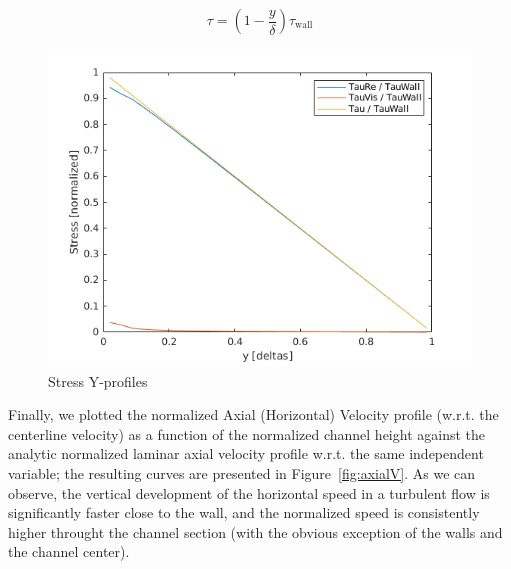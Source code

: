 \documentclass[12pt]{article}
\begin{document}
        \begin{equation} \label{eq:stress}
                \tau = (1 - \frac{y}{\delta}) \tau_{\text{wall}}
        \end{equation}

        \begin{figure}[ht!]
                \centering
                \includegraphics[width=\textwidth]{stress.png}
                \caption{Stress Y-profiles}
                \label{fig:stress}
        \end{figure}

        Finally, we plotted the normalized Axial (Horizontal) Velocity profile (w.r.t. the centerline velocity) as a function of the normalized channel height against the analytic normalized laminar axial velocity profile w.r.t. the same independent variable; the resulting curves are presented in Figure~\ref{fig:axialV}. As we can observe, the vertical development of the horizontal speed in a turbulent flow is significantly faster close to the wall, and the normalized speed is consistently higher throught the channel section (with the obvious exception of the walls and the channel center).
\end{document}
